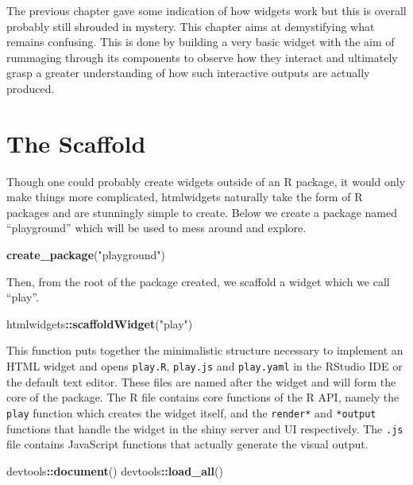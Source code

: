 \documentclass[
]{krantz}
\makeatletter
\newenvironment{Shaded}{\begin{snugshade}}{\end{snugshade}}
\newcommand{\KeywordTok}[1]{\textcolor[rgb]{0.27,0.27,0.27}{\textbf{#1}}}
\newcommand{\NormalTok}[1]{#1}
\newcommand{\OperatorTok}[1]{\textcolor[rgb]{0.43,0.43,0.43}{\textbf{#1}}}
\newcommand{\StringTok}[1]{\textcolor[rgb]{0.5,0.5,0.5}{#1}}
\newenvironment{kframe}{%
\medskip{}
\setlength{\fboxsep}{.8em}
 \def\at@end@of@kframe{}%
 \ifinner\ifhmode%
  \def\at@end@of@kframe{\end{minipage}}%
  \begin{minipage}{\columnwidth}%
 \fi\fi%
 \def\FrameCommand##1{\hskip\@totalleftmargin \hskip-\fboxsep
 \colorbox{shadecolor}{##1}\hskip-\fboxsep
     \hskip-\linewidth \hskip-\@totalleftmargin \hskip\columnwidth}%
 \MakeFramed {\advance\hsize-\width
   \@totalleftmargin\z@ \linewidth\hsize
   \@setminipage}}%
 {\par\unskip\endMakeFramed%
 \at@end@of@kframe}
\renewenvironment{Shaded}{\begin{kframe}}{\end{kframe}}
\makeatother
\begin{document}
The previous chapter gave some indication of how widgets work but this is overall probably still shrouded in mystery. This chapter aims at demystifying what remains confusing. This is done by building a very basic widget with the aim of rummaging through its components to observe how they interact and ultimately grasp a greater understanding of how such interactive outputs are actually produced.

\hypertarget{the-scaffold}{%
\section*{The Scaffold}\label{the-scaffold}}


Though one could probably create widgets outside of an R package, it would only make things more complicated, htmlwidgets naturally take the form of R packages and are stunningly simple to create. Below we create a package named ``playground'' which will be used to mess around and explore.

\begin{Shaded}
\begin{Highlighting}[]
\KeywordTok{create\_package}\NormalTok{(}\StringTok{"playground"}\NormalTok{)}
\end{Highlighting}
\end{Shaded}

Then, from the root of the package created, we scaffold a widget which we call ``play''.

\begin{Shaded}
\begin{Highlighting}[]
\NormalTok{htmlwidgets}\OperatorTok{::}\KeywordTok{scaffoldWidget}\NormalTok{(}\StringTok{"play"}\NormalTok{)}
\end{Highlighting}
\end{Shaded}

This function puts together the minimalistic structure necessary to implement an HTML widget and opens \texttt{play.R}, \texttt{play.js} and \texttt{play.yaml} in the RStudio IDE or the default text editor. These files are named after the widget and will form the core of the package. The R file contains core functions of the R API, namely the \texttt{play} function which creates the widget itself, and the \texttt{render*} and \texttt{*output} functions that handle the widget in the shiny server and UI respectively. The \texttt{.js} file contains JavaScript functions that actually generate the visual output.

\begin{Shaded}
\begin{Highlighting}[]
\NormalTok{devtools}\OperatorTok{::}\KeywordTok{document}\NormalTok{()}
\NormalTok{devtools}\OperatorTok{::}\KeywordTok{load\_all}\NormalTok{()}
\end{Highlighting}
\end{Shaded}
\end{document}
